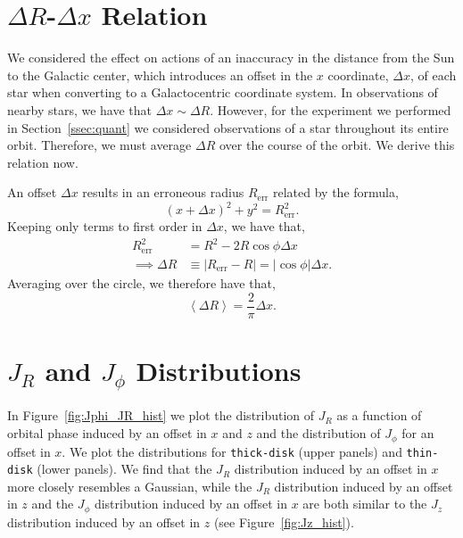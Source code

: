\documentclass[twocolumn]{aastex62}
\newcommand{\abs}[1]{\left| #1 \right|}
\newcommand{\avg}[1]{\left< #1 \right>}
\newcommand{\beq}{\begin{equation}}
\newcommand{\eeq}{\end{equation}}
\newcommand{\thin}{\texttt{thin-disk}}
\newcommand{\thick}{\texttt{thick-disk}}
\begin{document}
\section{$\Delta R$-$\Delta x$ Relation} \label{app:deltax}
We considered the effect on actions of an inaccuracy in the distance from the
Sun to the Galactic center, which introduces an offset in the $x$ coordinate,
$\Delta x$, of each star when converting to a Galactocentric coordinate
system. In observations of nearby stars, we have that $\Delta x \sim \Delta
R$. However, for the experiment we performed in Section~\ref{ssec:quant} we
considered observations of a star throughout its entire orbit. Therefore, we
must average $\Delta R$ over the course of the orbit. We derive this relation
now.

An offset $\Delta x$ results in an erroneous radius $R_{\text{err}}$ related by
the formula,
\beq
(x+\Delta x)^2 + y^2 = R_{\text{err}}^2\text{.}
\eeq
Keeping only terms to first order in $\Delta x$, we have that,
\beq
\begin{split}
R_{\text{err}}^2 &= R^2 - 2 R \cos{\phi} \Delta x \\
\implies \Delta R &\equiv \abs{R_{\text{err}} - R}
        = \abs{\cos{\phi}} \Delta x\text{.}
\end{split}
\eeq
Averaging over the circle, we therefore have that,
\beq
\avg{\Delta R} = \frac{2}{\pi} \Delta x\text{.}
\eeq

\section{$J_R$ and $J_{\phi}$ Distributions} \label{app:hist}

In Figure~\ref{fig:Jphi_JR_hist} we plot the distribution of $J_R$ as a
function of orbital phase induced by an offset in $x$ and $z$ and the
distribution of $J_{\phi}$ for an offset in $x$. We plot the distributions for
\thick{} (upper panels) and \thin{} (lower panels). We find that the $J_R$ distribution induced by an offset in $x$ more
closely resembles a Gaussian, while the $J_R$ distribution induced by
an offset in $z$ and the $J_{\phi}$ distribution induced by an offset
in $x$ are both similar to the $J_z$ distribution induced by an
offset in $z$ (see Figure~\ref{fig:Jz_hist}).
\end{document}

